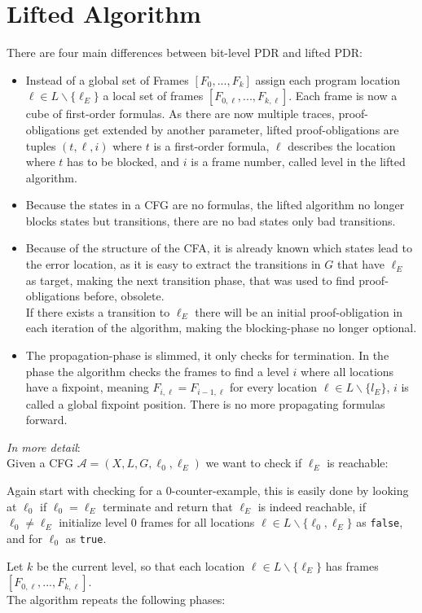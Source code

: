 \documentclass[11pt, a4paper, BCOR=10mm, ngerman, oneside]{scrbook}
\begin{document}
\section{Lifted Algorithm}
There are four main differences between bit-level PDR and lifted PDR:
\begin{itemize}

\item Instead of a global set of Frames $[F_0, ..., F_k]$ assign each program location $\ell \in L \backslash \{\ell_E\}$ a local set of frames $[F_{0, \ell}, ..., F_{k, \ell}]$. Each frame is now a cube of first-order formulas. As there are now multiple traces, proof-obligations get extended by another parameter, lifted proof-obligations are tuples $(t, \ell, i)$ where $t$ is a first-order formula, $\ell$ describes the location where $t$ has to be blocked, and $i$ is a frame number, called level in the lifted algorithm.

\item 
Because the states in a CFG are no formulas, the lifted algorithm no longer blocks states but transitions, there are no bad states only bad transitions.

\item Because of the structure of the CFA, it is already known which states lead to the error location, as it is easy to extract the transitions in $G$ that have $\ell_E$ as target, making the next transition phase, that was used to find proof-obligations before, obsolete. \\ If there exists a transition to $\ell_E$ there will be an initial proof-obligation in each iteration of the algorithm, making the blocking-phase no longer optional.

\item The propagation-phase is slimmed, it only checks for termination. In the phase the algorithm checks the frames to find a level $i$ where all locations have a fixpoint, meaning  $F_{i, \ell} = F_{i-1, \ell}$ for every location $\ell \in L \backslash \{l_E \}$, $i$ is called a global fixpoint position. There is no more propagating formulas forward.
\end{itemize}

\hspace*{5cm}

\textsl{In more detail}: \\
Given a CFG $\mathcal{A} = (X, L, G, \ell_0, \ell_E)$ we want to check if $\ell_E$ is reachable: \par
Again start with checking for a 0-counter-example, this is easily done by looking at $\ell_0$ if $\ell_0 = \ell_E$ terminate and return that $\ell_E$ is indeed reachable, if $\ell_0 \neq \ell_E$ initialize level 0 frames for all locations $\ell \in L \backslash \{\ell_0, \ell_E\}$ as \texttt{false}, and for $\ell_0$ as \texttt{true}. \par
Let $k$ be the current level, so that each location $\ell \in L \backslash \{\ell_E\}$ has frames $[F_{0, \ell}, ..., F_{k, \ell}]$. \\
The algorithm repeats the following phases: \\
\end{document}
